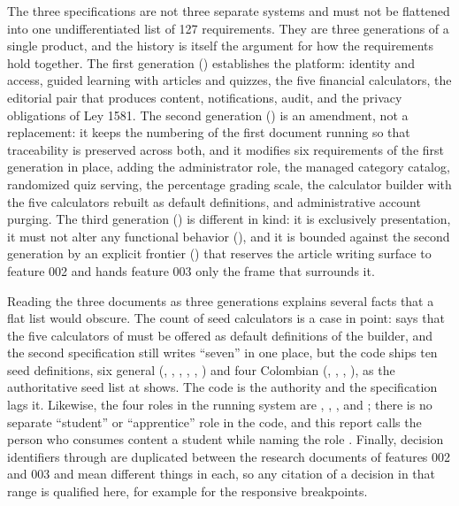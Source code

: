 The three specifications are not three separate systems and must not be flattened into one
undifferentiated list of 127 requirements. They are three generations of a single product, and the
history is itself the argument for how the requirements hold together. The first generation
() establishes the platform: identity and access, guided learning with
articles and quizzes, the five financial calculators, the editorial pair that produces content,
notifications, audit, and the privacy obligations of Ley 1581. The second generation
() is an amendment, not a replacement: it keeps the
numbering of the first document running so that traceability is preserved across both, and it
modifies six requirements of the first generation in place, adding the administrator role, the
managed category catalog, randomized quiz serving, the percentage grading scale, the calculator
builder with the five calculators rebuilt as default definitions, and administrative account
purging. The third generation () is different in kind: it is
exclusively presentation, it must not alter any functional behavior (), and it is
bounded against the second generation by an explicit frontier () that reserves the
article writing surface to feature 002 and hands feature 003 only the frame that surrounds it.

Reading the three documents as three generations explains several facts that a flat list would
obscure. The count of seed calculators is a case in point:  says that the five
calculators of  must be offered as default definitions of the builder, and the second
specification still writes \enquote{seven} in one place, but the code ships ten seed definitions,
six general (, , , ,
, ) and four Colombian (, ,
, ), as the authoritative seed list at
 shows. The code is the authority and the
specification lags it. Likewise, the four roles in the running system are ,
, , and ; there is no separate
\enquote{student} or \enquote{apprentice} role in the code, and this report calls the person who
consumes content a student while naming the role . Finally, decision
identifiers  through  are duplicated between the research documents of
features 002 and 003 and mean different things in each, so any citation of a decision in that
range is qualified here, for example  for the responsive breakpoints.

